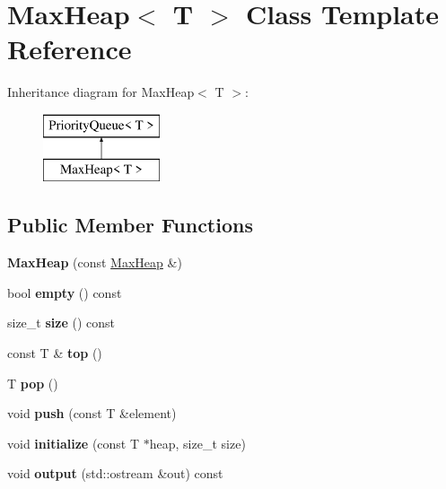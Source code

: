 \hypertarget{classMaxHeap}{}\section{Max\+Heap$<$ T $>$ Class Template Reference}
\label{classMaxHeap}
Inheritance diagram for Max\+Heap$<$ T $>$\+:\begin{figure}[H]
\begin{center}
\leavevmode
\includegraphics[height=2.000000cm]{classMaxHeap}
\end{center}
\end{figure}
\subsection*{Public Member Functions}
\begin{DoxyCompactItemize}
\item 
\mbox{\label{classMaxHeap_a3019a58bae06ffd512751c207ac3a283}} 
{\bfseries Max\+Heap} (const \hyperlink{classMaxHeap}{Max\+Heap} \&)
\item 
\mbox{\label{classMaxHeap_a69ff7dea02ebd78a83a78c27a2bb9e8e}} 
bool {\bfseries empty} () const
\item 
\mbox{\label{classMaxHeap_a1894c47131530a277c2f778659520fa4}} 
size\+\_\+t {\bfseries size} () const
\item 
\mbox{\label{classMaxHeap_a86d38fba3ad10fadd0f263971789fc59}} 
const T \& {\bfseries top} ()
\item 
\mbox{\label{classMaxHeap_a01b465e86ec79b6c920fa6a5d141756b}} 
T {\bfseries pop} ()
\item 
\mbox{\label{classMaxHeap_ada1f7b3a03a4af9dd023ff0f52e92d71}} 
void {\bfseries push} (const T \&element)
\item 
\mbox{\label{classMaxHeap_a0f509a4d2603a54f019e490bceb58858}} 
void {\bfseries initialize} (const T $\ast$heap, size\+\_\+t size)
\item 
\mbox{\label{classMaxHeap_adb475bbb8add5f39777f83cf982530c2}} 
void {\bfseries output} (std\+::ostream \&out) const
\end{DoxyCompactItemize}

